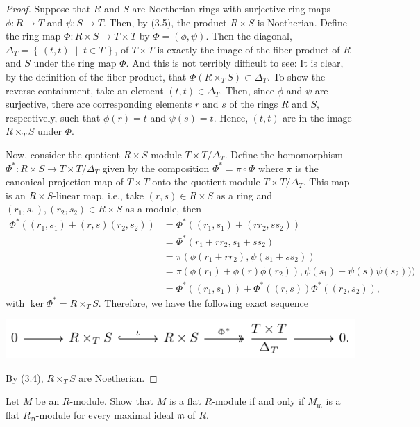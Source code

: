 \begin{proof}
Suppose that $R$ and $S$ are Noetherian rings with surjective
ring maps $\phi\colon R\to T$ and $\psi\colon S\to T$. Then, by
(3.5), the product $R\times S$ is Noetherian. Define the ring map
$\Phi\colon R\times S\to T\times T$ by $\Phi=(\phi,\psi)$. Then
the diagonal, $\Delta_T=\left\{\,(t,t)\;\middle|\; t\in
  T\,\right\}$, of $T\times T$ is exactly the image of the fiber
product of $R$ and $S$ under the ring map $\Phi$. And this is not
terribly difficult to see: It is clear, by the definition of the
fiber product, that $\Phi(R\times_T S)\subset\Delta_T$. To show
the reverse containment, take an element
$(t,t)\in\Delta_T$. Then, since $\phi$ and $\psi$ are surjective,
there are corresponding elements $r$ and $s$ of the rings $R$ and
$S$, respectively, such that $\phi(r)=t$ and $\psi(s)=t$. Hence,
$(t,t)$ are in the image $R\times_T S$ under $\Phi$.

Now, consider the quotient $R\times S$-module $T\times
T/\Delta_T$. Define the homomorphism $\Phi^*\colon R\times S\to
T\times T/\Delta_T$ given by the composition
$\Phi^*=\pi\circ\Phi$ where $\pi$ is the canonical projection map
of $T\times T$ onto the quotient module $T\times
T/\Delta_T$. This map is an $R\times S$-linear map, i.e., take
$(r,s)\in R\times S$ as a ring and $(r_1,s_1),(r_2,s_2)\in
R\times S$ as a module, then
\begin{align*}
\Phi^*((r_1,s_1)+(r,s)(r_2,s_2))
&=\Phi^*((r_1,s_1)+(rr_2,ss_2))\\
&=\Phi^*(r_1+rr_2,s_1+ss_2)\\
&=\pi(\phi(r_1+rr_2),\psi(s_1+ss_2))\\
&=\pi(\phi(r_1)+\phi(r)\phi(r_2)),\psi(s_1)+\psi(s)\psi(s_2)))\\
&=\Phi^*((r_1,s_1))+\Phi^*((r,s))\Phi^*((r_2,s_2)),
\end{align*}
with $\ker\Phi^*=R\times_T S$. Therefore, we have the following
exact sequence
\begin{center}
\includegraphics{figures/ps4-p2-short-exact-seq}
\end{center}
By (3.4), $R\times_T S$ are Noetherian.
\end{proof}
\newpage
\begin{problem}
Let $M$ be an $R$-module. Show that $M$ is a flat $R$-module if
and only if $M_{\mathfrak{m}}$ is a flat
$R_{\mathfrak{m}}$-module for every maximal ideal $\mathfrak{m}$
of $R$.
\end{problem}
